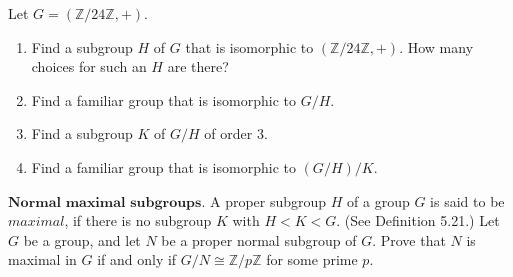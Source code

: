 \documentclass[12pt,letterpaper,boxed]{hmcpset}
\begin{document}
\begin{solution}
\end{solution}

\clearpage

\begin{problem}[11.5.5]
Let $G = (\mathbb{Z}/24\mathbb{Z}, +)$.
\begin{enumerate}[label=\alph*]
\item Find a subgroup $H$ of $G$ that is isomorphic to $(\mathbb{Z}/24\mathbb{Z},+)$. How many choices for such an $H$ are there?
\item Find a familiar group that is isomorphic to $G/H$.
\item Find a subgroup $K$ of $G/H$ of order 3.
\item Find a familiar group that is isomorphic to $(G/H)/K$.
\end{enumerate}
\end{problem}

\begin{solution}

\end{solution}

\clearpage

\begin{problem}[11.5.8]
$\textbf{Normal maximal subgroups.}$ A proper subgroup $H$ of a group $G$ is said to be $\textit{maximal}$, if there is no subgroup $K$ with $H < K < G$. (See Definition 5.21.) Let $G$ be a group, and let $N$ be a proper normal subgroup of $G$. Prove that $N$ is maximal in $G$ if and only if $G/N \cong \mathbb{Z}/p\mathbb{Z}$ for some prime $p$.
\end{problem}

\begin{solution}
\end{solution}
\end{document}
